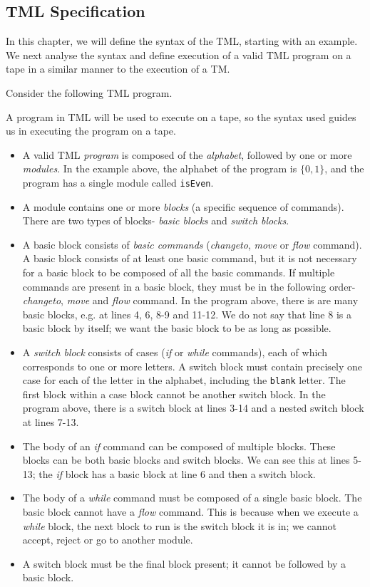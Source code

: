 \begin{appendices}
\chapter{TML Specification}

In this chapter, we will define the syntax of the TML, starting with an example. We next analyse the syntax and define execution of a valid TML program on a tape in a similar manner to the execution of a TM.

Consider the following TML program.

A program in TML will be used to execute on a tape, so the syntax used guides us in executing the program on a tape.
\begin{itemize}
    \item A valid TML \emph{program} is composed of the \emph{alphabet}, followed by one or more \emph{modules}. In the example above, the alphabet of the program is $\{0, 1\}$, and the program has a single module called \texttt{isEven}.
    \item A module contains one or more \emph{blocks} (a specific sequence of commands). There are two types of blocks- \emph{basic blocks} and \emph{switch blocks}.
    \item A basic block consists of \emph{basic commands} (\textit{changeto}, \textit{move} or \textit{flow} command). A basic block consists of at least one basic command, but it is not necessary for a basic block to be composed of all the basic commands. If multiple commands are present in a basic block, they must be in the following order- \textit{changeto}, \textit{move} and \textit{flow} command. In the program above, there is are many basic blocks, e.g. at lines 4, 6, 8-9 and 11-12. We do not say that line 8 is a basic block by itself; we want the basic block to be as long as possible.
    \item A \emph{switch block} consists of cases (\textit{if} or \textit{while} commands), each of which corresponds to one or more letters. A switch block must contain precisely one case for each of the letter in the alphabet, including the \texttt{blank} letter. The first block within a case block cannot be another switch block. In the program above, there is a switch block at lines 3-14 and a nested switch block at lines 7-13.
    \item The body of an \textit{if} command can be composed of multiple blocks. These blocks can be both basic blocks and switch blocks. We can see this at lines 5-13; the \textit{if} block has a basic block at line 6 and then a switch block.
    \item The body of a \textit{while} command must be composed of a single basic block. The basic block cannot have a \textit{flow} command. This is because when we execute a \textit{while} block, the next block to run is the switch block it is in; we cannot accept, reject or go to another module.
    \item A switch block must be the final block present; it cannot be followed by a basic block.
\end{itemize}


\end{appendices}
